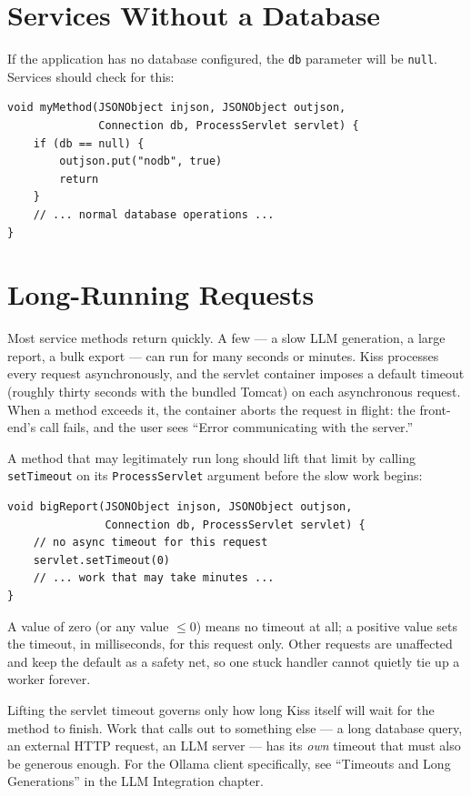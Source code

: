 \section{Services Without a Database}
\label{sec:svc-nodb}

If the application has no database configured, the \texttt{db} parameter will be \texttt{null}.  Services should check for this:

\begin{lstlisting}[style=groovy]
void myMethod(JSONObject injson, JSONObject outjson,
              Connection db, ProcessServlet servlet) {
    if (db == null) {
        outjson.put("nodb", true)
        return
    }
    // ... normal database operations ...
}
\end{lstlisting}

\section{Long-Running Requests}
\label{sec:long-running-requests}

Most service methods return quickly.  A few --- a slow LLM generation, a large
report, a bulk export --- can run for many seconds or minutes.  Kiss processes
every request asynchronously, and the servlet container imposes a default
timeout (roughly thirty seconds with the bundled Tomcat) on each asynchronous
request.  When a method exceeds it, the container aborts the request in flight:
the front-end's call fails, and the user sees ``Error communicating with the
server.''

A method that may legitimately run long should lift that limit by calling
\texttt{setTimeout} on its \texttt{ProcessServlet} argument before the slow work
begins:

\begin{lstlisting}[style=groovy]
void bigReport(JSONObject injson, JSONObject outjson,
               Connection db, ProcessServlet servlet) {
    // no async timeout for this request
    servlet.setTimeout(0)
    // ... work that may take minutes ...
}
\end{lstlisting}

\noindent
A value of zero (or any value $\le 0$) means no timeout at all; a positive value
sets the timeout, in milliseconds, for this request only.  Other requests are
unaffected and keep the default as a safety net, so one stuck handler cannot
quietly tie up a worker forever.

\begin{notebox}
Lifting the servlet timeout governs only how long Kiss itself will wait for the
method to finish.  Work that calls out to something else --- a long database
query, an external HTTP request, an LLM server --- has its \emph{own} timeout
that must also be generous enough.  For the Ollama client specifically, see
``Timeouts and Long Generations'' in the LLM Integration chapter.
\end{notebox}

